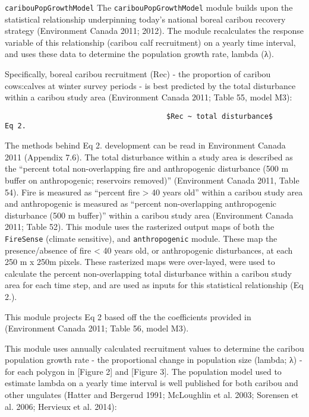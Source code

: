 \documentclass[]{article}
\begin{document}
\texttt{caribouPopGrowthModel} The \texttt{caribouPopGrowthModel} module
builds upon the statistical relationship underpinning today's national
boreal caribou recovery strategy (Environment Canada 2011; 2012). The
module recalculates the response variable of this relationship (caribou
calf recruitment) on a yearly time interval, and uses these data to
determine the population growth rate, lambda (λ).

Specifically, boreal caribou recruitment (Rec) - the proportion of
caribou cows:calves at winter survey periods - is best predicted by the
total disturbance within a caribou study area (Environment Canada 2011;
Table 55, model M3):

\begin{verbatim}
                                      $Rec ~ total disturbance$                                     Eq 2.
\end{verbatim}

The methods behind Eq 2. development can be read in Environment Canada
2011 (Appendix 7.6). The total disturbance within a study area is
described as the ``percent total non-overlapping fire and anthropogenic
disturbance (500 m buffer on anthropogenic; reservoirs removed)''
(Environment Canada 2011, Table 54). Fire is measured as ``percent fire
\textgreater{} 40 years old'' within a caribou study area and
anthropogenic is measured as ``percent non-overlapping anthropogenic
disturbance (500 m buffer)'' within a caribou study area (Environment
Canada 2011; Table 52). This module uses the rasterized output maps of
both the \texttt{FireSense} (climate sensitive), and
\texttt{anthropogenic} module. These map the presence/absence of fire
\textless{} 40 years old, or anthropogenic disturbances, at each 250 m x
250m pixels. These rasterized maps were over-layed, were used to
calculate the percent non-overlapping total disturbance within a caribou
study area for each time step, and are used as inputs for this
statistical relationship (Eq 2.).

This module projects Eq 2 based off the the coefficients provided in
(Environment Canada 2011; Table 56, model M3).

This module uses annually calculated recruitment values to determine the
caribou population growth rate - the proportional change in population
size (lambda; λ) - for each polygon in {[}Figure 2{]} and {[}Figure
3{]}. The population model used to estimate lambda on a yearly time
interval is well published for both caribou and other ungulates (Hatter
and Bergerud 1991; McLoughlin et al. 2003; Sorensen et al. 2006;
Hervieux et al. 2014):
\end{document}
